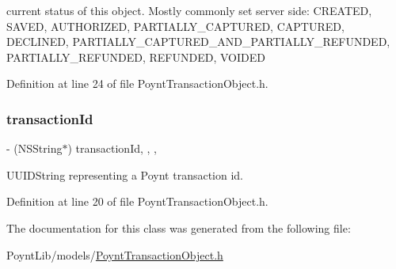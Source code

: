 current status of this object. Mostly commonly set server side\+: \textquotesingle{}C\+R\+E\+A\+T\+ED\textquotesingle{}, \textquotesingle{}S\+A\+V\+ED\textquotesingle{}, \textquotesingle{}A\+U\+T\+H\+O\+R\+I\+Z\+ED\textquotesingle{}, \textquotesingle{}P\+A\+R\+T\+I\+A\+L\+L\+Y\+\_\+\+C\+A\+P\+T\+U\+R\+ED\textquotesingle{}, \textquotesingle{}C\+A\+P\+T\+U\+R\+ED\textquotesingle{}, \textquotesingle{}D\+E\+C\+L\+I\+N\+ED\textquotesingle{}, \textquotesingle{}P\+A\+R\+T\+I\+A\+L\+L\+Y\+\_\+\+C\+A\+P\+T\+U\+R\+E\+D\+\_\+\+A\+N\+D\+\_\+\+P\+A\+R\+T\+I\+A\+L\+L\+Y\+\_\+\+R\+E\+F\+U\+N\+D\+ED\textquotesingle{}, \textquotesingle{}P\+A\+R\+T\+I\+A\+L\+L\+Y\+\_\+\+R\+E\+F\+U\+N\+D\+ED\textquotesingle{}, \textquotesingle{}R\+E\+F\+U\+N\+D\+ED\textquotesingle{}, \textquotesingle{}V\+O\+I\+D\+ED\textquotesingle{} 



Definition at line 24 of file Poynt\+Transaction\+Object.\+h.

\hypertarget{interface_poynt_transaction_object_aacd11580c330a78310c344d78baecf8c}{}\label{interface_poynt_transaction_object_aacd11580c330a78310c344d78baecf8c} 
\subsubsection{\texorpdfstring{transaction\+Id}{transactionId}}
{\footnotesize\ttfamily -\/ (N\+S\+String$\ast$) transaction\+Id\hspace{0.3cm}{\ttfamily [read]}, {\ttfamily [write]}, {\ttfamily [nonatomic]}, {\ttfamily [copy]}}



U\+U\+I\+D\+String representing a Poynt transaction id. 



Definition at line 20 of file Poynt\+Transaction\+Object.\+h.



The documentation for this class was generated from the following file\+:\begin{DoxyCompactItemize}
\item 
Poynt\+Lib/models/\hyperlink{_poynt_transaction_object_8h}{Poynt\+Transaction\+Object.\+h}\end{DoxyCompactItemize}
